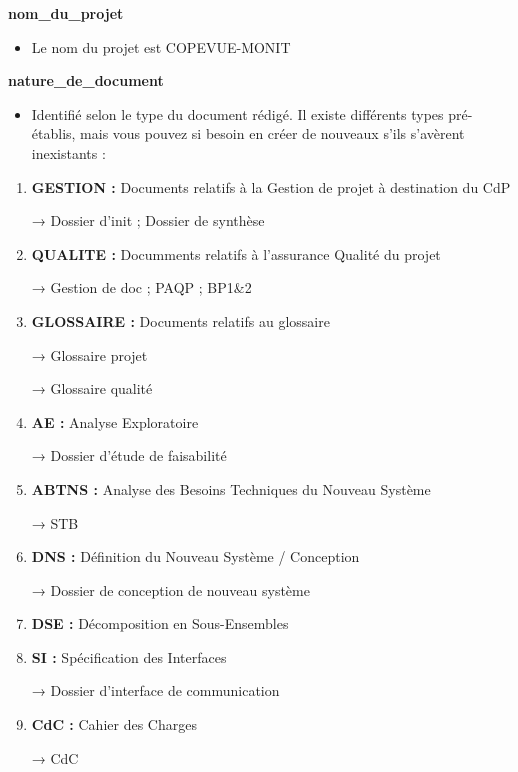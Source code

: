 \documentclass{mise_en_page}
\begin{document}
\textbf{nom\_du\_projet}

\begin{itemize}
\item Le nom du projet est COPEVUE-MONIT
\end{itemize}



\textbf{nature\_de\_document}

\begin{itemize}
\item Identifié selon le type du document rédigé. Il existe différents
types pré-établis, mais vous pouvez si besoin en créer de nouveaux
s’ils s’avèrent inexistants :
\end{itemize}
\begin{enumerate}
\item \textbf{GESTION :} Documents relatifs à la Gestion de projet à destination
du CdP

→ Dossier d’init ; Dossier de synthèse
\item \textbf{QUALITE :} Documments relatifs à l’assurance Qualité du projet

→ Gestion de doc ; PAQP ; BP1\&2

\item \textbf{GLOSSAIRE :} Documents relatifs au glossaire

→ Glossaire projet

→ Glossaire qualité

\item \textbf{AE :} Analyse Exploratoire

→ Dossier d’étude de faisabilité

\item \textbf{ABTNS :} Analyse des Besoins Techniques du Nouveau Système

→ STB

\item \textbf{DNS :} Définition du Nouveau Système / Conception

→ Dossier de conception de nouveau système

\item \textbf{DSE :} Décomposition en Sous-Ensembles
\item \textbf{SI :} Spécification des Interfaces

→ Dossier d’interface de communication
\item \textbf{CdC :}  Cahier des Charges

→ CdC

\end{enumerate}
\end{document}
